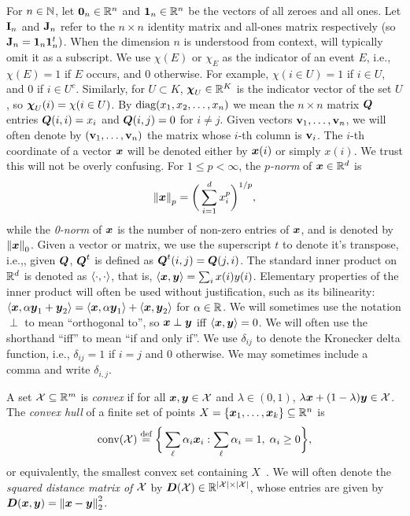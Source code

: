 For $n\in \mathbb{N}$, let $\vb{0}_n\in\mathbb{R}^n$ and $\vb{1}_n\in\mathbb{R}^n$ be the vectors of all zeroes and all ones. Let $\vb{I}_n$ and $\vb{J}_n$  refer to the $n\times n$ identity matrix and all-ones matrix respectively (so $\vb{J}_n=\vb{1}_n\vb{1}_n^t)$. When the dimension $n$ is understood from context, will typically omit it as a subscript. We use $\chi(E)$ or $\chi_E$ as the indicator of an event $E$, i.e., $\chi(E)=1$ if $E$ occurs, and 0 otherwise. For example, $\chi(i\in U)=1$ if $i\in U$, and 0 if $i\in U^c$.  Similarly, for $U\subset K$,  $\boldsymbol{\chi}_U\in\mathbb{R}^K$ is the indicator vector of the set $U$, so $\boldsymbol{\chi}_U(i)=\chi(i\in U)$. 
By $\text{diag}(x_1,x_2,\dots,x_n)$ we mean the $n\times n$ matrix $\vb*{Q}$ entries $\vb*{Q}(i,i)=x_i$ and $\vb*{Q}(i,j)=0$ for $i\neq j$. Given vectors $\vb{v}_1,\dots,\vb{v}_n$, we will often denote by $(\vb{v}_1,\dots,\vb{v}_n)$ the matrix whose $i$-th column is $\vb{v}_i$. The $i$-th coordinate of a vector $\vb*{x}$ will be denoted either by $\vb*{x}(i)$ or simply $x(i)$. We trust this will not be overly confusing.  For $1\leq p<\infty$, the \emph{$p$-norm} of $\vb*{x}\in \mathbb{R}^d$ is 
\begin{equation}
\label{eq:pnorm}
\norm{\vb*{x}}_p = \bigg(\sum_{i=1}^d x_i^p\bigg)^{1/p},
\end{equation}
while the \emph{0-norm} of $\vb*{x}$ is the number of non-zero entries of $\vb*{x}$, and is denoted by $\norm{\vb*{x}}_0$.  Given a vector or matrix, we use the superscript $t$ to denote it's transpose, i.e.,, given $\vb*{Q}$, $\vb*{Q}^t$ is defined as $\vb*{Q}^t(i,j) = \vb*{Q}(j,i)$. The standard inner product on $\mathbb{R}^d$ is denoted as $\langle\cdot,\cdot\rangle$, that is, $\langle \vb*{x},\vb*{y}\rangle = \sum_i x(i)y(i)$. Elementary properties of the inner product will often be used without justification, such as its bilinearity: $\langle \vb*{x},\alpha\vb*{y}_1+\vb*{y}_2\rangle  = \langle \vb*{x},\alpha\vb*{y}_1\rangle + \langle \vb*{x},\vb*{y}_2\rangle$ for $\alpha\in\mathbb{R}$.  We will sometimes use the notation $\perp$ to mean ``orthogonal to'', so $\vb*{x}\perp\vb*{y}$ iff $\langle\vb*{x},\vb*{y}\rangle=0$. We will often use the shorthand ``iff'' to mean ``if and only if''. We use $\delta_{ij}$ to denote the Kronecker delta function, i.e., $\delta_{ij} = 1$ if $i=j$ and 0 otherwise. We may sometimes include a comma and write $\delta_{i,j}$. 

A set $\mathcal{X}\subseteq\mathbb{R}^m$ is \emph{convex} if for all $\vb*{x},\vb*{y}\in\mathcal{X}$ and $\lambda\in(0,1)$, $\lambda\vb*{x} + (1-\lambda)\vb*{y}\in \mathcal{X}$. 
The \emph{convex hull} of a finite set of points $X=\{\vb*{x}_1,\dots,\vb*{x}_k\}\subseteq \mathbb{R}^n$ is 
\begin{equation}
\label{eq:conv(X)}
\textnormal{conv}(\mathcal{X}) \overset{\text{def}}{=} \bigg\{\sum_\ell \alpha_i\vb*{x}_i: \sum_\ell \alpha_i = 1, \;\alpha_i\geq 0\bigg\},
\end{equation}
or equivalently, the smallest convex set containing $X$~\cite{grunbaum1967convex}. We will often denote the \emph{squared distance matrix of $\mathcal{X}$} by $\vb*{D}(\mathcal{X})\in\mathbb{R}^{|\mathcal{X}|\times |\mathcal{X}|}$,  whose entries are given by $\vb*{D}(\vb*{x},\vb*{y}) = \norm{\vb*{x}-\vb*{y}}_2^2$.  


